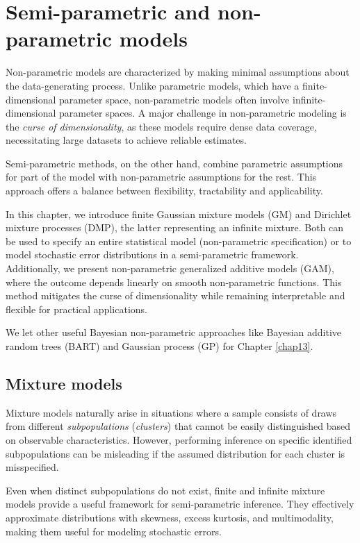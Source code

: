 \chapter{Semi-parametric and non-parametric models}\label{chap11}

Non-parametric models are characterized by making minimal assumptions about the data-generating process. Unlike parametric models, which have a finite-dimensional parameter space, non-parametric models often involve infinite-dimensional parameter spaces. A major challenge in non-parametric modeling is the \textit{curse of dimensionality}, as these models require dense data coverage, necessitating large datasets to achieve reliable estimates.

Semi-parametric methods, on the other hand, combine parametric assumptions for part of the model with non-parametric assumptions for the rest. This approach offers a balance between flexibility, tractability and applicability.

In this chapter, we introduce finite Gaussian mixture models (GM) and Dirichlet mixture processes (DMP), the latter representing an infinite mixture. Both can be used to specify an entire statistical model (non-parametric specification) or to model stochastic error distributions in a semi-parametric framework. Additionally, we present non-parametric generalized additive models (GAM), where the outcome depends linearly on smooth non-parametric functions. This method mitigates the curse of dimensionality while remaining interpretable and flexible for practical applications. 

We let other useful Bayesian non-parametric approaches like Bayesian additive random trees (BART) and Gaussian process (GP) for Chapter \ref{chap13}. 

\section{Mixture models}\label{sec11_1}
Mixture models naturally arise in situations where a sample consists of draws from different \textit{subpopulations} (\textit{clusters}) that cannot be easily distinguished based on observable characteristics. However, performing inference on specific identified subpopulations can be misleading if the assumed distribution for each cluster is misspecified.  

Even when distinct subpopulations do not exist, finite and infinite mixture models provide a useful framework for semi-parametric inference. They effectively approximate distributions with skewness, excess kurtosis, and multimodality, making them useful for modeling stochastic errors.

